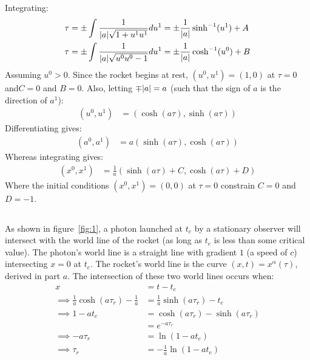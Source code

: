 \documentclass[a4paper]{article}
\begin{document}
Integrating:
\begin{align*}
\tau &= \pm \int \frac{1}{\abs{a}\sqrt{1 + u^1 u^1}} du^1 = \pm \frac{1}{\abs{a}}\sinh^{-1}(u^1) + A\\
\tau &= \pm \int \frac{1}{\abs{a}\sqrt{u^0 u^0 - 1}} du^1 = \pm \frac{1}{\abs{a}}\cosh^{-1}(u^0) + B
\end{align*}
Assuming $u^0 > 0$. Since the rocket begins at rest, $(u^0, u^1) = (1, 0)$ at $\tau = 0$ and$C = 0$ and $B = 0$. Also, letting $\mp \abs{a} = a$ (such that the sign of $a$ is the direction of $a^1$):
\begin{align*}
(u^0, u^1) &= (\cosh(a \tau), \sinh(a\tau))
\end{align*}
Differentiating gives:
\begin{align*}
	(a^0, a^1) &= a(\sinh(a \tau), \cosh(a\tau))
\end{align*}
Whereas integrating gives:
\begin{align*}
	(x^0, x^1) &= \frac{1}{a}(\sinh(a \tau) + C, \cosh(a\tau) + D)
\end{align*}
Where the initial conditions $(x^0, x^1) = (0, 0)$ at $\tau = 0$ constrain $C = 0$ and $D = -1$.



\subsection{}
As shown in figure~\ref{fig:1}, a photon launched at $t_e$ by a stationary observer will intersect with the world line of the rocket (as long as $t_e$ is less than some critical value). 
The photon's world line is a straight line with gradient $1$ (a speed of $c$) intersecting $x=0$ at $t_e$.
The rocket's world line is the curve $(x, t) = x^\alpha(\tau)$, derived in part $a$.
The intersection of these two world lines occurs when:
\begin{align*}
	x &= t - t_e\\
	\implies \frac{1}{a}\cosh(a\tau_r) - \frac{1}{a} &= \frac{1}{a} \sinh(a\tau_r) - t_e\\
	\implies 1-at_e &= \cosh(a\tau_r) - \sinh(a\tau_r) \\
	&= e^{-a \tau_r}\\
	\implies -a \tau_r &= \ln(1-at_e)\\
	\implies \tau_r &= -\frac{1}{a} \ln(1-at_e)
\end{align*}



\subsection{}
\end{document}
